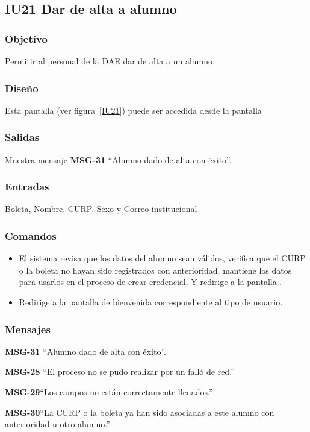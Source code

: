 
\subsection{IU21 Dar de alta a alumno}

\subsubsection{Objetivo}
	Permitir al personal de la DAE dar de alta a un alumno.
\subsubsection{Diseño}
    Esta pantalla  (ver figura~\ref{IU21}) puede ser accedida desde la pantalla 


\subsubsection{Salidas}
Muestra mensaje {\bf MSG-31} ``Alumno dado de alta con éxito''.
\subsubsection{Entradas}
    \hyperlink{Alumno.Boleta}{Boleta}, \hyperlink{Alumno.Nombre}{Nombre}, \hyperlink{Alumno.CURP}{CURP}, \hyperlink{Alumno.Sexo}{Sexo} y \hyperlink{Alumno.Correo institucional}{Correo institucional}
\subsubsection{Comandos}
\begin{itemize}
    \item {}  El sistema revisa que los datos del alumno sean válidos, verifica que el CURP o la boleta no hayan sido registrados con anterioridad, mantiene los datos para usarlos en el proceso de crear credencial. Y redirige a la pantalla .
    \item {} Redirige a la pantalla de bienvenida correspondiente al tipo de usuario.
    
\end{itemize}

\subsubsection{Mensajes}

\begin{Citemize}
    \item {\bf MSG-31} ``Alumno dado de alta con éxito''.
    \item {\bf MSG-28}  ``El proceso no se pudo realizar por un falló de red.''
    \item {\bf MSG-29}{``Los campos no están correctamente llenados.''}
    \item {\bf MSG-30}{``La CURP o la boleta ya han sido asociadas a este alumno con anterioridad u otro alumno.''}
\end{Citemize}
